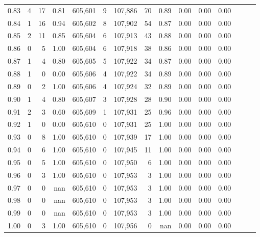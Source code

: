 \begin{tabular}{rrrrrrrrrrrrrrr}
0.83 &       4 &     17 &  0.81 &  605,601 &        9 &  107,886 &       70 &  0.89 &  0.00 &  0.00 &      0.00 \\
0.84 &       1 &     16 &  0.94 &  605,602 &        8 &  107,902 &       54 &  0.87 &  0.00 &  0.00 &      0.00 \\
0.85 &       2 &     11 &  0.85 &  605,604 &        6 &  107,913 &       43 &  0.88 &  0.00 &  0.00 &      0.00 \\
0.86 &       0 &      5 &  1.00 &  605,604 &        6 &  107,918 &       38 &  0.86 &  0.00 &  0.00 &      0.00 \\
0.87 &       1 &      4 &  0.80 &  605,605 &        5 &  107,922 &       34 &  0.87 &  0.00 &  0.00 &      0.00 \\
0.88 &       1 &      0 &  0.00 &  605,606 &        4 &  107,922 &       34 &  0.89 &  0.00 &  0.00 &      0.00 \\
0.89 &       0 &      2 &  1.00 &  605,606 &        4 &  107,924 &       32 &  0.89 &  0.00 &  0.00 &      0.00 \\
0.90 &       1 &      4 &  0.80 &  605,607 &        3 &  107,928 &       28 &  0.90 &  0.00 &  0.00 &      0.00 \\
0.91 &       2 &      3 &  0.60 &  605,609 &        1 &  107,931 &       25 &  0.96 &  0.00 &  0.00 &      0.00 \\
0.92 &       1 &      0 &  0.00 &  605,610 &        0 &  107,931 &       25 &  1.00 &  0.00 &  0.00 &      0.00 \\
0.93 &       0 &      8 &  1.00 &  605,610 &        0 &  107,939 &       17 &  1.00 &  0.00 &  0.00 &      0.00 \\
0.94 &       0 &      6 &  1.00 &  605,610 &        0 &  107,945 &       11 &  1.00 &  0.00 &  0.00 &      0.00 \\
0.95 &       0 &      5 &  1.00 &  605,610 &        0 &  107,950 &        6 &  1.00 &  0.00 &  0.00 &      0.00 \\
0.96 &       0 &      3 &  1.00 &  605,610 &        0 &  107,953 &        3 &  1.00 &  0.00 &  0.00 &      0.00 \\
0.97 &       0 &      0 &   nan &  605,610 &        0 &  107,953 &        3 &  1.00 &  0.00 &  0.00 &      0.00 \\
0.98 &       0 &      0 &   nan &  605,610 &        0 &  107,953 &        3 &  1.00 &  0.00 &  0.00 &      0.00 \\
0.99 &       0 &      0 &   nan &  605,610 &        0 &  107,953 &        3 &  1.00 &  0.00 &  0.00 &      0.00 \\
1.00 &       0 &      3 &  1.00 &  605,610 &        0 &  107,956 &        0 &   nan &  0.00 &  0.00 &      0.00 \\
\bottomrule
\end{tabular}
